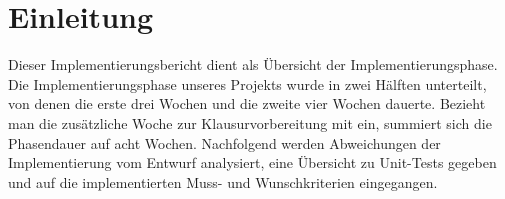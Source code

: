 \chapter{Einleitung}
Dieser Implementierungsbericht dient als Übersicht der Implementierungsphase.\newline
\linebreak
Die Implementierungsphase unseres Projekts wurde in zwei Hälften unterteilt, von denen die erste drei Wochen und die zweite vier Wochen dauerte. Bezieht man die zusätzliche Woche zur Klausurvorbereitung mit ein, summiert sich die Phasendauer auf acht Wochen.\newline
\linebreak
Nachfolgend werden Abweichungen der Implementierung vom Entwurf analysiert, eine Übersicht zu Unit-Tests gegeben und auf die implementierten Muss- und Wunschkriterien eingegangen.